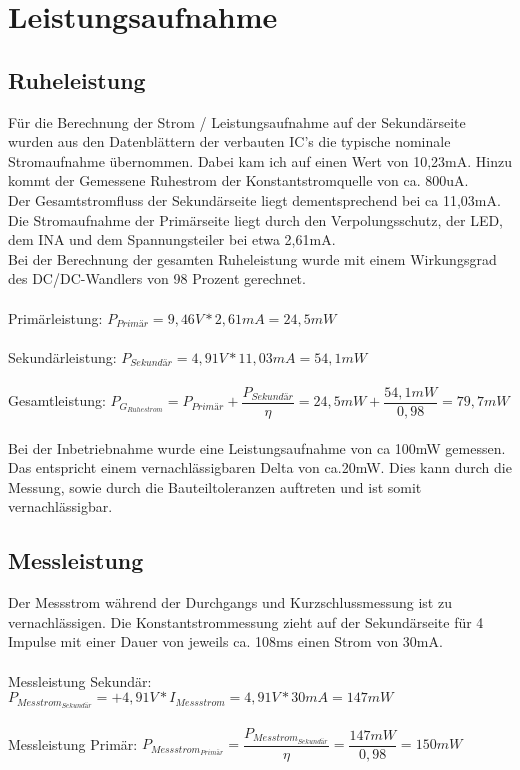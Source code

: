 \section{Leistungsaufnahme}

\subsection{Ruheleistung}
Für die Berechnung der Strom / Leistungsaufnahme auf der Sekundärseite wurden aus den Datenblättern der verbauten IC's die typische nominale Stromaufnahme übernommen. Dabei kam ich auf einen Wert von 10,23mA. Hinzu kommt der Gemessene Ruhestrom der Konstantstromquelle von ca. 800uA. 
\\
Der Gesamtstromfluss der Sekundärseite liegt dementsprechend bei ca 11,03mA.
\\
Die Stromaufnahme der Primärseite liegt durch den Verpolungsschutz, der LED, dem INA und dem Spannungsteiler bei etwa 2,61mA. 
\\
Bei der Berechnung der gesamten Ruheleistung wurde mit einem Wirkungsgrad des DC/DC-Wandlers von 98 Prozent gerechnet. 
\\
\\
Primärleistung: $P_{Primär} = 9,46V * 2,61mA = 24,5mW$
\\
\\
Sekundärleistung: $P_{Sekundär} = 4,91V * 11,03mA = 54,1mW$
\\
\\
Gesamtleistung: $P_{G_{Ruhestrom}} = P_{Primär} + \dfrac{P_{Sekundär}}{\eta} = 24,5mW + \dfrac{54,1mW}{0,98} = 79,7mW$
\\
\\
Bei der Inbetriebnahme wurde eine Leistungsaufnahme von ca 100mW gemessen. Das entspricht einem vernachlässigbaren Delta von ca.20mW. Dies kann durch die Messung, sowie durch die Bauteiltoleranzen auftreten und ist somit vernachlässigbar.

\subsection{Messleistung}

Der Messstrom während der Durchgangs und Kurzschlussmessung ist zu vernachlässigen. Die Konstantstrommessung zieht auf der Sekundärseite für 4 Impulse mit einer Dauer von jeweils ca. 108ms einen Strom von 30mA.
\\
\\
Messleistung Sekundär: $P_{Messtrom_{Sekundär}} = +4,91V * I_{Messstrom} = 4,91V * 30mA = 147mW$
\\
\\
Messleistung Primär: $P_{Messstrom_{Primär}} = \dfrac{P_{Messtrom_{Sekundär}}}{\eta} = \dfrac{147mW}{0,98} = 150mW$


